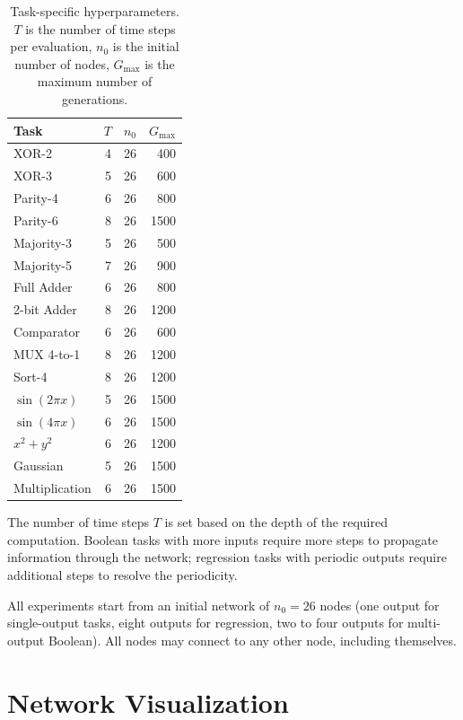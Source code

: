 \begin{table}[h]
  \centering
  \small
  \caption{Task-specific hyperparameters. $T$ is the number of time
    steps per evaluation, $n_0$ is the initial number of nodes,
    $G_{\max}$ is the maximum number of generations.}
  \label{tab:task-hp}
  \begin{tabular}{lrrr}
    \toprule
    \textbf{Task} & $T$ & $n_0$ & $G_{\max}$ \\
    \midrule
    XOR-2         & 4 & 26 &  400 \\
    XOR-3         & 5 & 26 &  600 \\
    Parity-4      & 6 & 26 &  800 \\
    Parity-6      & 8 & 26 & 1500 \\
    Majority-3    & 5 & 26 &  500 \\
    Majority-5    & 7 & 26 &  900 \\
    Full Adder    & 6 & 26 &  800 \\
    2-bit Adder   & 8 & 26 & 1200 \\
    Comparator    & 6 & 26 &  600 \\
    MUX 4-to-1    & 8 & 26 & 1200 \\
    Sort-4        & 8 & 26 & 1200 \\
    $\sin(2\pi x)$& 5 & 26 & 1500 \\
    $\sin(4\pi x)$& 6 & 26 & 1500 \\
    $x^2 + y^2$   & 6 & 26 & 1200 \\
    Gaussian      & 5 & 26 & 1500 \\
    Multiplication& 6 & 26 & 1500 \\
    \bottomrule
  \end{tabular}
\end{table}

The number of time steps $T$ is set based on the depth of the required
computation. Boolean tasks with more inputs require more steps to
propagate information through the network; regression tasks with
periodic outputs require additional steps to resolve the periodicity.

All experiments start from an initial network of $n_0 = 26$ nodes
(one output for single-output tasks, eight outputs for regression, two
to four outputs for multi-output Boolean). All nodes may connect to
any other node, including themselves.

\section{Network Visualization}
\label{sec:exp-viz}

